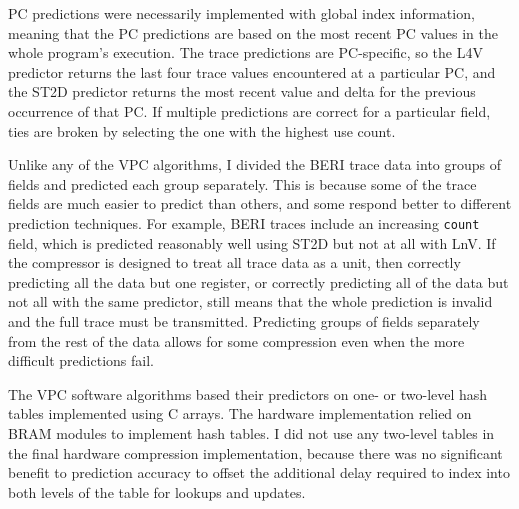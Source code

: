 \documentclass[conference]{IEEEtran}
\begin{document}
PC predictions were necessarily implemented with global index information, meaning that the PC predictions are based on the most recent PC values in the whole program's execution. The trace predictions are PC-specific, so the L4V predictor returns the last four trace values encountered at a particular PC, and the ST2D predictor returns the most recent value and delta for the previous occurrence of that PC. If multiple predictions are correct for a particular field, ties are broken by selecting the one with the highest use count.  

Unlike any of the VPC algorithms, I divided the BERI trace data into groups of fields and predicted each group separately. This is because some of the trace fields are much easier to predict than others, and some respond better to different prediction techniques. For example, BERI traces include an increasing \texttt{count} field, which is predicted reasonably well using ST2D but not at all with LnV. If the compressor is designed to treat all trace data as a unit, then correctly predicting all the data but one register, or correctly predicting all of the data but not all with the same predictor, still means that the whole prediction is invalid and the full trace must be transmitted. Predicting groups of fields separately from the rest of the data allows for some compression even when the more difficult predictions fail. 

The VPC software algorithms based their predictors on one- or two-level hash tables implemented using C arrays. The hardware implementation relied on BRAM modules to implement hash tables. I did not use any two-level tables in the final hardware compression implementation, because there was no significant benefit to prediction accuracy to offset the additional delay required to index into both levels of the table for lookups and updates. 
\end{document}
